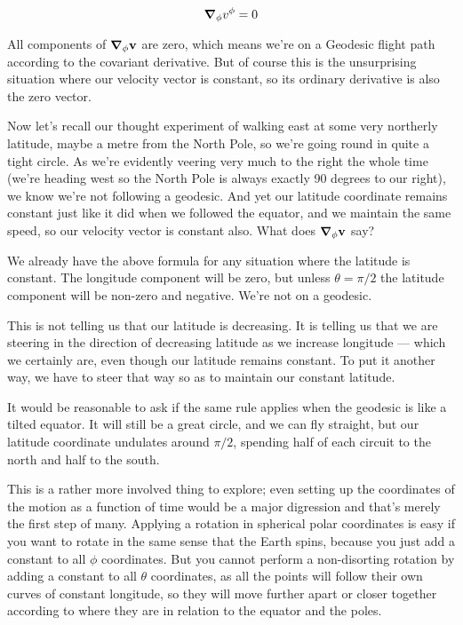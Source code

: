$$
\grad_{\phi} v^{\phi} = 0
$$

All components of $\grad_{\phi} \mathbf{v}$ are zero, which means we're on a Geodesic flight path according to the covariant derivative. But of course this is the unsurprising situation where our velocity vector is constant, so its ordinary derivative is also the zero vector.

Now let's recall our thought experiment of walking east at some very northerly latitude, maybe a metre from the North Pole, so we're going round in quite a tight circle. As we're evidently veering very much to the right the whole time (we're heading west so the North Pole is always exactly 90 degrees to our right), we know we're not following a geodesic. And yet our latitude coordinate remains constant just like it did when we followed the equator, and we maintain the same speed, so our velocity vector is constant also. What does $\grad_\phi \mathbf{v}$ say?

We already have the above formula for any situation where the latitude is constant. The longitude component will be zero, but unless $\theta = \pi/2$ the latitude component will be non-zero and negative. We're not on a geodesic.

This is not telling us that our latitude is decreasing. It is telling us that we are steering in the direction of decreasing latitude as we increase longitude --- which we certainly are, even though our latitude remains constant. To put it another way, we have to steer that way so as to maintain our constant latitude.

It would be reasonable to ask if the same rule applies when the geodesic is like a tilted equator. It will still be a great circle, and we can fly straight, but our latitude coordinate undulates around $\pi/2$, spending half of each circuit to the north and half to the south.

This is a rather more involved thing to explore; even setting up the coordinates of the motion as a function of time would be a major digression and that's merely the first step of many. Applying a rotation in spherical polar coordinates is easy if you want to rotate in the same sense that the Earth spins, because you just add a constant to all $\phi$ coordinates. But you cannot perform a non-disorting rotation by adding a constant to all $\theta$ coordinates, as all the points will follow their own curves of constant longitude, so they will move further apart or closer together according to where they are in relation to the equator and the poles.

